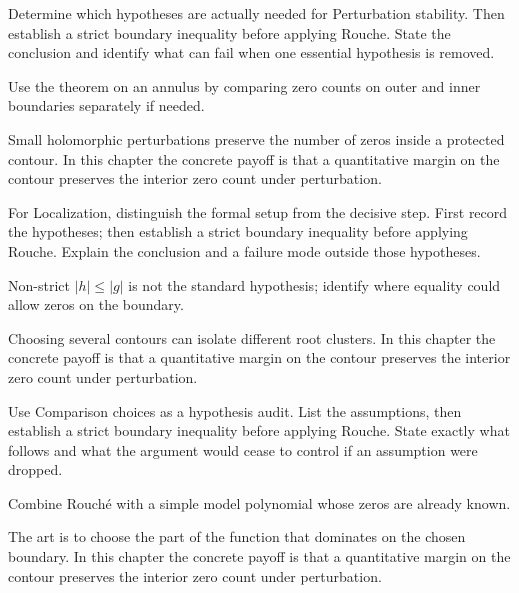 \begin{exercise}\label{exr:iv13-05}
Determine which hypotheses are actually needed for Perturbation stability. Then establish a strict boundary inequality before applying Rouche. State the conclusion and identify what can fail when one essential hypothesis is removed.
\end{exercise}
\begin{hint}
Use the theorem on an annulus by comparing zero counts on outer and inner boundaries separately if needed.
\end{hint}
\begin{solution}
Small holomorphic perturbations preserve the number of zeros inside a protected contour. In this chapter the concrete payoff is that a quantitative margin on the contour preserves the interior zero count under perturbation.
\end{solution}

\begin{exercise}\label{exr:iv13-06}
For Localization, distinguish the formal setup from the decisive step. First record the hypotheses; then establish a strict boundary inequality before applying Rouche. Explain the conclusion and a failure mode outside those hypotheses.
\end{exercise}
\begin{hint}
Non-strict \(|h|\le|g|\) is not the standard hypothesis; identify where equality could allow zeros on the boundary.
\end{hint}
\begin{solution}
Choosing several contours can isolate different root clusters. In this chapter the concrete payoff is that a quantitative margin on the contour preserves the interior zero count under perturbation.
\end{solution}

\begin{exercise}\label{exr:iv13-07}
Use Comparison choices as a hypothesis audit. List the assumptions, then establish a strict boundary inequality before applying Rouche. State exactly what follows and what the argument would cease to control if an assumption were dropped.
\end{exercise}
\begin{hint}
Combine Rouché with a simple model polynomial whose zeros are already known.
\end{hint}
\begin{solution}
The art is to choose the part of the function that dominates on the chosen boundary. In this chapter the concrete payoff is that a quantitative margin on the contour preserves the interior zero count under perturbation.
\end{solution}

